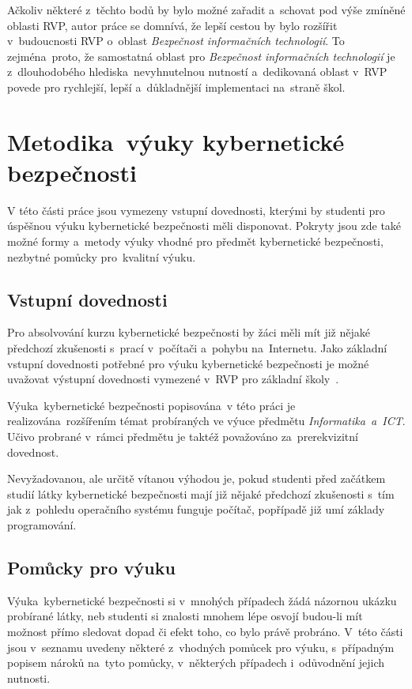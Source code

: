 \documentclass[a4paper, 12pt]{article}
\begin{document}
Ačkoliv některé z~těchto bodů by bylo možné zařadit a~schovat pod výše zmíněné oblasti RVP, autor práce se domnívá, že lepší cestou by bylo rozšířit v~budoucnosti RVP o~oblast \textit{Bezpečnost informačních technologií}. To zejména~proto, že samostatná oblast pro \textit{Bezpečnost informačních technologií} je z~dlouhodobého hlediska~nevyhnutelnou nutností a~dedikovaná oblast v~RVP povede pro rychlejší, lepší a~důkladnější implementaci na~straně škol.


\newpage
\section{Metodika~výuky kybernetické bezpečnosti}
V této části práce jsou vymezeny vstupní dovednosti, kterými by studenti pro úspěšnou výuku kybernetické bezpečnosti měli disponovat. Pokryty jsou zde také možné formy a~metody výuky vhodné pro předmět kybernetické bezpečnosti, nezbytné pomůcky pro~kvalitní výuku.

\subsection{Vstupní dovednosti}
Pro absolvování kurzu kybernetické bezpečnosti by žáci měli mít již nějaké předchozí zkušenosti s~prací v~počítači a~pohybu na~Internetu. Jako základní vstupní dovednosti potřebné pro výuku kybernetické bezpečnosti je možné uvažovat výstupní dovednosti vymezené v~RVP pro základní školy~\cite{rvpElementary}. 

Výuka~kybernetické bezpečnosti popisována~v této práci je realizována~rozšířením témat probíraných ve výuce předmětu \textit{Informatika~a~ICT}. Učivo probrané v~rámci předmětu je taktéž považováno za~prerekvizitní dovednost.

Nevyžadovanou, ale určitě vítanou výhodou je, pokud studenti před začátkem studií látky kybernetické bezpečnosti mají již nějaké předchozí zkušenosti s~tím jak z~pohledu operačního systému funguje počítač, popřípadě již umí základy programování.

\subsection{Pomůcky pro výuku}
Výuka~kybernetické bezpečnosti si v~mnohých případech žádá názornou ukázku probírané látky, neb studenti si znalosti mnohem lépe osvojí budou-li mít možnost přímo sledovat dopad či efekt toho, co bylo právě probráno. V~této části jsou v~seznamu uvedeny některé z~vhodných pomůcek pro výuku, s~případným popisem nároků na~tyto pomůcky, v~některých případech i~odůvodnění jejich nutnosti.
\end{document}
